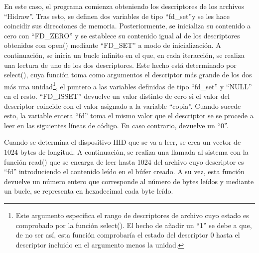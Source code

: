 En este caso, el programa comienza obteniendo los descriptores de los archivos ``Hidraw''. Tras esto, se definen dos variables de tipo ``fd\_set''y se les hace coincidir sus direcciones de memoria. Posteriormente, se inicializa su contenido a cero con ``FD\_ZERO'' y se establece su contenido igual al de los descriptores obtenidos con open() mediante ``FD\_SET'' a modo de inicialización. A continuación, se inicia un bucle infinito en el que, en cada iteracción, se realiza una lectura de uno de los dos descriptores. Este hecho está determinado por select(), cuya función toma como argumentos el descriptor más grande de los dos más una unidad\footnote{Este argumento especifica el rango de descriptores de archivo cuyo estado es comprobado por la función select(). El hecho de añadir un ``1'' se debe a que, de no ser así, esta función comprobaría el estado del descriptor 0 hasta el descriptor incluido en el argumento menos la unidad.}, el puntero a las variables definidas de tipo ``fd\_set'' y ``NULL'' en el resto. ``FD\_ISSET'' devuelve un valor distinto de cero si el valor del descriptor coincide con el valor asignado a la variable ``copia''. Cuando sucede esto, la variable entera ``fd'' toma el mismo valor que el descriptor se se procede a leer en las siguientes líneas de código. En caso contrario, devuelve un ``0''. 

Cuando se determina el dispositivo HID que se va a leer, se crea un vector de 1024 bytes de longitud. A continuación, se realiza una llamada al sistema con la función read() que se encarga de leer hasta 1024 del archivo cuyo descriptor es ``fd'' introduciendo el contenido leído en el búfer creado. A su vez, esta función devuelve un número entero que corresponde al número de bytes leídos y mediante un bucle, se representa en hexadecimal cada byte leído.\\

